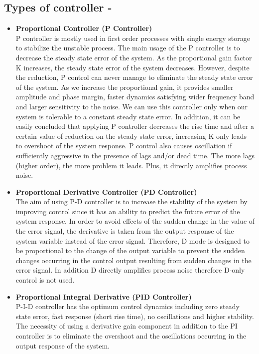 \documentclass[a4paper,12pt,oneside]{book}
\begin{document}
\subsection{\textbf{Types of controller - }}
    \begin{itemize}
    \item \textbf{Proportional Controller (P Controller)}\\
             P controller is mostly used in first order processes with single energy storage to stabilize the
            unstable process. The main usage of the P controller is to decrease the steady state error of the system. As the proportional gain factor K increases, the steady state error of the system
            decreases. However, despite the reduction, P control can never manage to eliminate the steady
            state error of the system. As we increase the proportional gain, it provides smaller amplitude and phase margin, faster dynamics satisfying wider frequency band and larger sensitivity to the noise. We can use this controller only when our system is tolerable to a constant steady state error. In addition, it can be easily concluded that applying P controller decreases the rise time and after a certain value of reduction on the steady state error, increasing K only leads to overshoot of the system response. P control also causes oscillation if sufficiently aggressive in the presence of lags and/or dead time. The more lags (higher order), the more problem it leads. Plus, it directly amplifies process noise.
    \item \textbf{Proportional Derivative  Controller (PD Controller)}\\
            The aim of using P-D controller is to increase the stability of the system by improving control since it has an ability to predict the future error of the system response. In order to avoid effects of the sudden change in the value of the error signal, the derivative is taken from the output response of the system variable instead of the error signal. Therefore, D mode is designed to be proportional to the change of the output variable to prevent the sudden changes occurring in the control output resulting from sudden changes in the error signal. In addition D directly amplifies process noise therefore D-only control is not used. 
    \item \textbf{Proportional Integral Derivative (PID Controller)}\\
            P-I-D controller has the optimum control dynamics including zero steady state error, fast response (short rise time), no oscillations and higher stability. The necessity of using a derivative gain component in addition to the PI controller is to eliminate the overshoot and the oscillations occurring in the output response of the system.
    \end{itemize}
\end{document}
